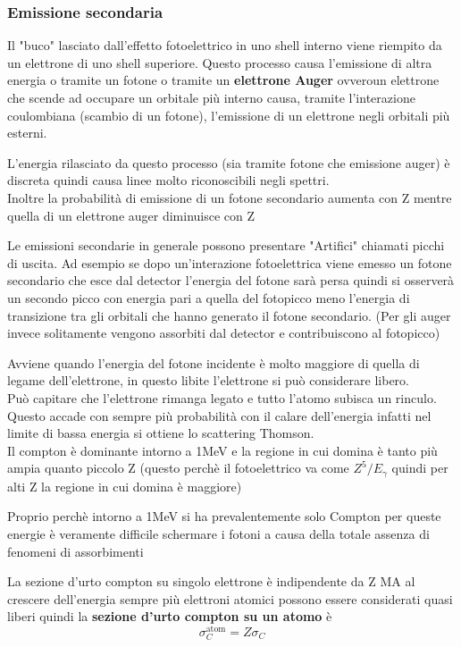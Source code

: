 \subsubsection*{Emissione secondaria}
Il "buco" lasciato dall'effetto fotoelettrico in uno shell interno viene riempito da un elettrone di uno shell superiore. Questo processo causa l'emissione di altra energia o tramite un fotone o tramite un \textbf{elettrone Auger} ovveroun elettrone che scende ad occupare un orbitale più interno causa, tramite l'interazione coulombiana (scambio di un fotone), l'emissione di un elettrone negli orbitali più esterni.

\begin{details}
L'energia rilasciato da questo processo (sia tramite fotone che emissione auger) è discreta quindi causa linee molto riconoscibili negli spettri.
\\
Inoltre la probabilità di emissione di un fotone secondario aumenta con Z mentre quella di un elettrone auger diminuisce con Z
\end{details}
\vspace{5pt}
Le emissioni secondarie in generale possono presentare "Artifici" chiamati picchi di uscita.
Ad esempio se dopo un'interazione fotoelettrica viene emesso un fotone secondario che esce dal detector l'energia del fotone sarà persa quindi si osserverà un secondo picco con energia pari a quella del fotopicco meno l'energia di transizione tra gli orbitali che hanno generato il fotone secondario. (Per gli auger invece solitamente vengono assorbiti dal detector e contribuiscono al fotopicco)

Avviene quando l'energia del fotone incidente è molto maggiore di quella di legame dell'elettrone, in questo libite l'elettrone si può considerare libero.
\\
Può capitare che l'elettrone rimanga legato e tutto l'atomo subisca un rinculo. Questo accade con sempre più probabilità con il calare dell'energia infatti nel limite di bassa energia si ottiene lo scattering Thomson.
\\
Il compton è dominante intorno a 1MeV e la regione in cui domina è tanto più ampia quanto piccolo Z (questo perchè il fotoelettrico va come $Z^5/E_\gamma$ quindi per alti Z la regione in cui domina è maggiore)
\begin{remark}
    Proprio perchè intorno a 1MeV si ha prevalentemente solo Compton per queste energie è veramente difficile schermare i fotoni a causa della totale assenza di fenomeni di assorbimenti
\end{remark}
La sezione d'urto compton su singolo elettrone è indipendente da Z MA al crescere dell'energia sempre più elettroni atomici possono essere considerati quasi liberi quindi la \textbf{sezione d'urto compton su un atomo} è
\[\sigma_C^{\text{atom}}=Z\sigma_C\]

